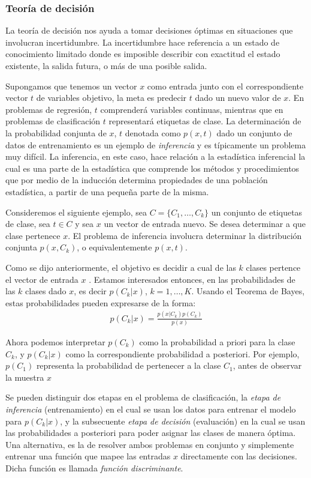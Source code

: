 \subsubsection{Teoría de decisión}
	
	La teoría de decisión nos ayuda a tomar decisiones óptimas en situaciones que involucran incertidumbre. La incertidumbre hace referencia a un estado de conocimiento limitado donde es imposible describir con exactitud el estado existente, la salida futura, o más de una posible salida.
	
	Supongamos que tenemos un vector $x$ como entrada junto con el correspondiente vector $t$ de variables objetivo, la meta es predecir $t$ dado un nuevo valor de $x$. En problemas de regresión, $t$ comprenderá variables continuas, mientras que en problemas de clasificación $t$ representará etiquetas de clase. La determinación de la probabilidad conjunta de $x$, $t$ denotada como $p(x,t)$ dado un conjunto de datos de entrenamiento es un ejemplo de \textit{inferencia} y es típicamente un problema muy difícil. La inferencia, en este caso, hace relación a la estadística inferencial la cual es una parte de la estadística que comprende los métodos y procedimientos que por medio de la inducción determina propiedades de una población estadística, a partir de una pequeña parte de la misma.
	
	Consideremos el siguiente ejemplo, sea $C=\{C_1,\dots,C_k\}$ un conjunto de etiquetas de clase, sea $t \in C$ y sea $x$ un vector de entrada nuevo. Se desea determinar a que clase pertenece $x$. El problema de inferencia involucra determinar la distribución conjunta $p(x,C_k)$, o equivalentemente $p(x,t)$.

	Como se dijo anteriormente, el objetivo es decidir a cual de las $k$ clases pertence el vector de entrada $x$ . Estamos interesados entonces, en las probabilidades de las $k$ clases dado $x$, es decir $p(C_k|x)$, $k=1,\dots,K$. Usando el Teorema de Bayes, estas probabilidades pueden expresarse de la forma:
		\begin{align*}
			p(C_k|x) = \frac{p(x|C_k)p(C_k)}{p(x)}
		\end{align*}

	Ahora podemos interpretar $p(C_k)$ como la probabilidad a priori para la clase $C_k$, y $p(C_k|x)$ como la correspondiente probabilidad a posteriori. Por ejemplo, $p(C_1)$ representa la probabilidad de pertenecer a la clase $C_1$, antes de observar la muestra $x$
	
	Se pueden distinguir dos etapas en el problema de clasificación, la \textit{etapa de inferencia} (entrenamiento) en el cual se usan los datos para entrenar el modelo para $p(C_k|x)$, y la subsecuente \textit{etapa de decisión} (evaluación) en la cual se usan las probabilidades a posteriori para poder asignar las clases de manera óptima. Una alternativa, es la de resolver ambos problemas en conjunto y simplemente entrenar una función que mapee las entradas $x$ directamente con las decisiones. Dicha función es llamada \textit{función discriminante}.
	
